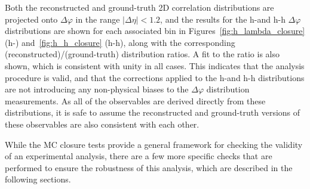 Both the reconstructed and ground-truth 2D correlation distributions are projected onto $\Delta\varphi$ in the range $|\Delta\eta| < 1.2$, and the results for the h-\lmb and h-h $\Delta\varphi$ distributions are shown for each associated \pt bin in Figures~\ref{fig:h_lambda_closure} (h-\lmb) and~\ref{fig:h_h_closure} (h-h), along with the corresponding (reconstructed)/(ground-truth) distribution ratios. A fit to the ratio is also shown, which is consistent with unity in all cases. This indicates that the analysis procedure is valid, and that the corrections applied to the h-\lmb and h-h distributions are not introducing any non-physical biases to the $\Delta\varphi$ distribution measurements. As all of the observables are derived directly from these distributions, it is safe to assume the reconstructed and ground-truth versions of these observables are also consistent with each other.

While the MC closure tests provide a general framework for checking the validity of an experimental analysis, there are a few more specific checks that are performed to ensure the robustness of this analysis, which are described in the following sections.

